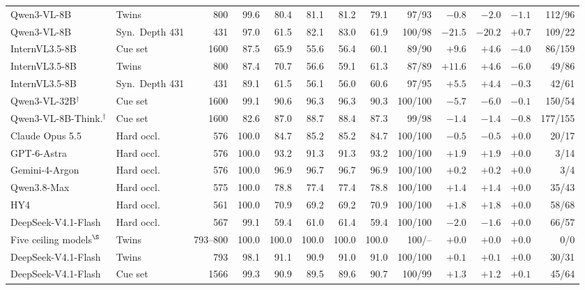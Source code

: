 \begin{tabular}{llrrrrrrrrrrr}
Qwen3-VL-8B & Twins & 800 & 99.6 & 80.4 & 81.1 & 81.2 & 79.1 & 97/93 & $-0.8$ & $-2.0$ & $-1.1$ & 112/96 \\
Qwen3-VL-8B & Syn.\ Depth 431 & 431 & 97.0 & 61.5 & 82.1 & 83.0 & 61.9 & 100/98 & $-21.5$ & $-20.2$ & $+0.7$ & 109/22 \\
InternVL3.5-8B & Cue set & 1600 & 87.5 & 65.9 & 55.6 & 56.4 & 60.1 & 89/90 & $+9.6$ & $+4.6$ & $-4.0$ & 86/159 \\
InternVL3.5-8B & Twins & 800 & 87.4 & 70.7 & 56.6 & 59.1 & 61.3 & 87/89 & $+11.6$ & $+4.6$ & $-6.0$ & 49/86 \\
InternVL3.5-8B & Syn.\ Depth 431 & 431 & 89.1 & 61.5 & 56.1 & 56.0 & 60.6 & 97/95 & $+5.5$ & $+4.4$ & $-0.3$ & 42/61 \\
Qwen3-VL-32B$^\dagger$ & Cue set & 1600 & 99.1 & 90.6 & 96.3 & 96.3 & 90.3 & 100/100 & $-5.7$ & $-6.0$ & $-0.1$ & 150/54 \\
Qwen3-VL-8B-Think.$^\dagger$ & Cue set & 1600 & 82.6 & 87.0 & 88.7 & 88.4 & 87.3 & 99/98 & $-1.4$ & $-1.4$ & $-0.8$ & 177/155 \\
\midrule
Claude Opus 5.5 & Hard occl. & 576 & 100.0 & 84.7 & 85.2 & 85.2 & 84.7 & 100/100 & $-0.5$ & $-0.5$ & $+0.0$ & 20/17 \\
GPT-6-Astra & Hard occl. & 576 & 100.0 & 93.2 & 91.3 & 91.3 & 93.2 & 100/100 & $+1.9$ & $+1.9$ & $+0.0$ & 3/14 \\
Gemini-4-Argon & Hard occl. & 576 & 100.0 & 96.9 & 96.7 & 96.7 & 96.9 & 100/100 & $+0.2$ & $+0.2$ & $+0.0$ & 3/4 \\
Qwen3.8-Max & Hard occl. & 575 & 100.0 & 78.8 & 77.4 & 77.4 & 78.8 & 100/100 & $+1.4$ & $+1.4$ & $+0.0$ & 35/43 \\
HY4 & Hard occl. & 561 & 100.0 & 70.9 & 69.2 & 69.2 & 70.9 & 100/100 & $+1.8$ & $+1.8$ & $+0.0$ & 58/68 \\
DeepSeek-V4.1-Flash & Hard occl. & 567 & 99.1 & 59.4 & 61.0 & 61.4 & 59.4 & 100/100 & $-2.0$ & $-1.6$ & $+0.0$ & 66/57 \\
Five ceiling models$^\S$ & Twins & 793--800 & 100.0 & 100.0 & 100.0 & 100.0 & 100.0 & 100/-- & $+0.0$ & $+0.0$ & $+0.0$ & 0/0 \\
DeepSeek-V4.1-Flash & Twins & 793 & 98.1 & 91.1 & 90.9 & 91.0 & 91.0 & 100/100 & $+0.1$ & $+0.1$ & $+0.0$ & 30/31 \\
DeepSeek-V4.1-Flash & Cue set & 1566 & 99.3 & 90.9 & 89.5 & 89.6 & 90.7 & 100/99 & $+1.3$ & $+1.2$ & $+0.1$ & 45/64 \\
\bottomrule

\end{tabular}
